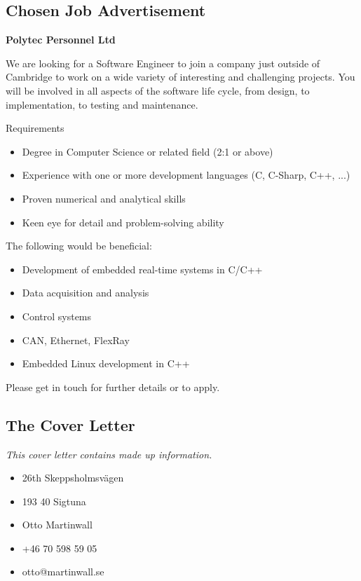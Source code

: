 \subsection{Chosen Job Advertisement}

\textbf{Polytec Personnel Ltd}

We are looking for a Software Engineer to join a company just outside of Cambridge to work on a wide variety of interesting and challenging projects. You will be involved in all aspects of the software life cycle, from design, to implementation, to testing and maintenance.

Requirements

\begin{itemize}
	\item Degree in Computer Science or related field (2:1 or above)
	\item Experience with one or more development languages (C, C-Sharp, C++, ...)
	\item Proven numerical and analytical skills
	\item Keen eye for detail and problem-solving ability
\end{itemize}

The following would be beneficial: 

\begin{itemize}
	\item Development of embedded real-time systems in C/C++
	\item Data acquisition and analysis
	\item Control systems
	\item CAN, Ethernet, FlexRay
	\item Embedded Linux development in C++
\end{itemize}

Please get in touch for further details or to apply.

\subsection{The Cover Letter}

\textit{This cover letter contains made up information.}

\newpage

\begin{itemize}
	\item 26th Skeppsholmsvägen
	\item 193 40 Sigtuna
	\item Otto Martinwall
	\item +46 70 598 59 05
	\item otto@martinwall.se
\end{itemize}

